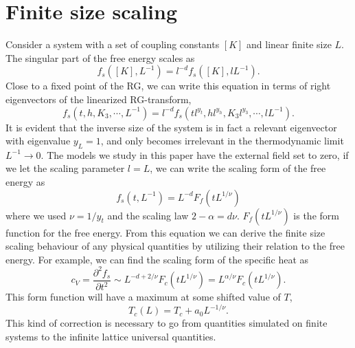 \section{Finite size scaling}
Consider a system with a set of coupling constants $[K]$ and linear finite size $L$. 
The singular part of the free energy scales as
\begin{equation}
  f_s([K],L^{-1}) = l^{-d}f_s([K],lL^{-1}).
  \label{}
\end{equation}
Close to a fixed point of the RG, we can write this equation in terms of right eigenvectors of the linearized RG-transform,
\begin{equation}
  f_s(t,h,K_3,\cdots,L^{-1}) = l^{-d}f_s(tl^{y_t},hl^{y_h},K_3 l^{y_3},\cdots,lL^{-1}).
  \label{}
\end{equation}
It is evident that the inverse size of the system is in fact a relevant eigenvector with eigenvalue $y_L = 1$, and only becomes irrelevant in the thermodynamic limit $L^{-1}\rightarrow 0$.
The models we study in this paper have the external field set to zero, if we let the scaling parameter $l = L$, we can write the scaling form of the free energy as
\begin{equation}
  f_s(t,L^{-1}) = L^{-d} F_f(t L^{1/\nu})
  \label{}
\end{equation}
where we used $\nu = 1/y_t$ and the scaling law $2 -\alpha = d\nu$.
$F_f(tL^{1/\nu})$ is the form function for the free energy.
From this equation we can derive the finite size scaling behaviour of any physical quantities by utilizing their relation to the free energy. 
For example, we can find the scaling form of the specific heat as
\begin{equation}
  c_V = \frac{\partial ^2 f_s}{\partial t^2} \sim L^{-d +2/\nu}F_{c}(tL^{1/\nu}) = L^{\alpha/\nu} F_{c}(tL^{1/\nu}).
  \label{}
\end{equation}
This form function will have a maximum at some shifted value of $T$, 
\begin{equation}
  T_c(L) = T_c +  a_0 L^{-1/\nu}.
  \label{}
\end{equation}
This kind of correction is necessary to go from quantities simulated on finite systems to the infinite lattice universal quantities.


